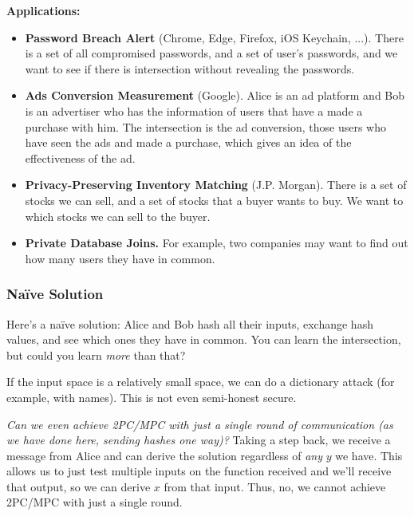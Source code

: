 \textbf{Applications:}
\begin{itemize}
    \item \textbf{Password Breach Alert} (Chrome, Edge, Firefox, iOS Keychain, ...). There is a set of all compromised passwords, and a set of user's passwords, and we want to see if there is intersection without revealing the passwords.
    \item \textbf{Ads Conversion Measurement} (Google). Alice is an ad platform and Bob is an advertiser who has the information of users that have a made a purchase with him. The intersection is the ad conversion, those users who have seen the ads and made a purchase, which gives an idea of the effectiveness of the ad.
    \item \textbf{Privacy-Preserving Inventory Matching} (J.P. Morgan). There is a set of stocks we can sell, and a set of stocks that a buyer wants to buy. We want to which stocks we can sell to the buyer.
    \item \textbf{Private Database Joins.} For example, two companies may want to find out how many users they have in common.
\end{itemize}

\subsubsection{Na\"ive Solution}
Here's a na\"ive solution: Alice and Bob hash all their inputs, exchange hash values, and see which ones they have in common. You can learn the intersection, but could you learn \emph{more} than that?


If the input space is a relatively small space, we can do a dictionary attack (for example, with names). This is not even semi-honest secure.

\emph{Can we even achieve 2PC/MPC with just a single round of communication (as we have done here, sending hashes one way)?} Taking a step back, we receive a message from Alice and can derive the solution regardless of \emph{any} $y$ we have. This allows us to just test multiple inputs on the function received and we'll receive that output, so we can derive $x$ from that input. Thus, no, we cannot achieve 2PC/MPC with just a single round.

